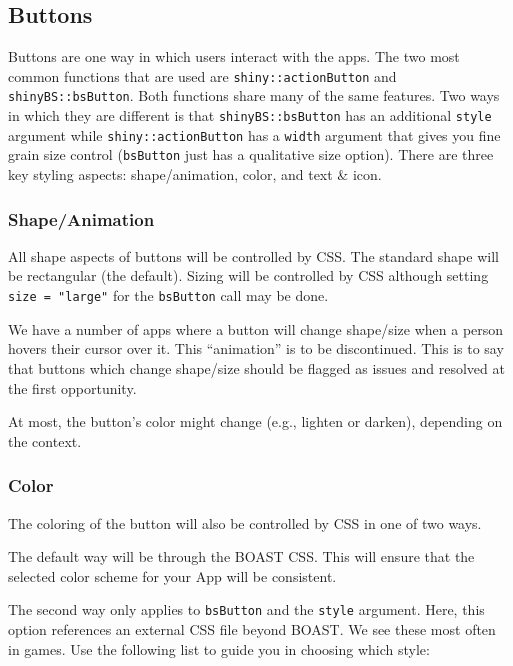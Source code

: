 \documentclass[
]{book}
\begin{document}
\hypertarget{buttons}{%
\subsection{Buttons}\label{buttons}}

Buttons are one way in which users interact with the apps. The two most common functions that are used are \texttt{shiny::actionButton} and \texttt{shinyBS::bsButton}. Both functions share many of the same features. Two ways in which they are different is that \texttt{shinyBS::bsButton} has an additional \texttt{style} argument while \texttt{shiny::actionButton} has a \texttt{width} argument that gives you fine grain size control (\texttt{bsButton} just has a qualitative size option). There are three key styling aspects: shape/animation, color, and text \& icon.

\hypertarget{shapeanimation}{%
\subsubsection{Shape/Animation}\label{shapeanimation}}

All shape aspects of buttons will be controlled by CSS. The standard shape will be rectangular (the default). Sizing will be controlled by CSS although setting \texttt{size\ =\ "large"} for the \texttt{bsButton} call may be done.

We have a number of apps where a button will change shape/size when a person hovers their cursor over it. This ``animation'' is to be discontinued. This is to say that buttons which change shape/size should be flagged as issues and resolved at the first opportunity.

At most, the button's color might change (e.g., lighten or darken), depending on the context.

\hypertarget{color}{%
\subsubsection{Color}\label{color}}

The coloring of the button will also be controlled by CSS in one of two ways.

The default way will be through the BOAST CSS. This will ensure that the selected color scheme for your App will be consistent.

The second way only applies to \texttt{bsButton} and the \texttt{style} argument. Here, this option references an external CSS file beyond BOAST. We see these most often in games. Use the following list to guide you in choosing which style:
\end{document}
